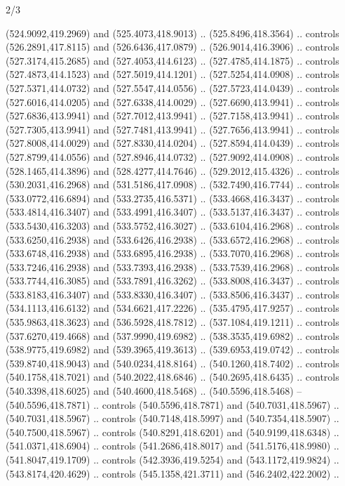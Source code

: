 \begin{flagdescription}{2/3}
\begin{scope}[xshift=0.5\flaglength,yshift=0.5\flagwidth,scale=\flagwidth/495.65]
\begin{scope}[y=0.8pt, x=0.8pt, yscale=-1,shift={(-463.76,-309.78)}]
  (524.9092,419.2969) and (525.4073,418.9013) .. (525.8496,418.3564) .. controls
  (526.2891,417.8115) and (526.6436,417.0879) .. (526.9014,416.3906) .. controls
  (527.3174,415.2685) and (527.4053,414.6123) .. (527.4785,414.1875) .. controls
  (527.4873,414.1523) and (527.5019,414.1201) .. (527.5254,414.0908) .. controls
  (527.5371,414.0732) and (527.5547,414.0556) .. (527.5723,414.0439) .. controls
  (527.6016,414.0205) and (527.6338,414.0029) .. (527.6690,413.9941) .. controls
  (527.6836,413.9941) and (527.7012,413.9941) .. (527.7158,413.9941) .. controls
  (527.7305,413.9941) and (527.7481,413.9941) .. (527.7656,413.9941) .. controls
  (527.8008,414.0029) and (527.8330,414.0204) .. (527.8594,414.0439) .. controls
  (527.8799,414.0556) and (527.8946,414.0732) .. (527.9092,414.0908) .. controls
  (528.1465,414.3896) and (528.4277,414.7646) .. (529.2012,415.4326) .. controls
  (530.2031,416.2968) and (531.5186,417.0908) .. (532.7490,416.7744) .. controls
  (533.0772,416.6894) and (533.2735,416.5371) .. (533.4668,416.3437) .. controls
  (533.4814,416.3407) and (533.4991,416.3407) .. (533.5137,416.3437) .. controls
  (533.5430,416.3203) and (533.5752,416.3027) .. (533.6104,416.2968) .. controls
  (533.6250,416.2938) and (533.6426,416.2938) .. (533.6572,416.2968) .. controls
  (533.6748,416.2938) and (533.6895,416.2938) .. (533.7070,416.2968) .. controls
  (533.7246,416.2938) and (533.7393,416.2938) .. (533.7539,416.2968) .. controls
  (533.7744,416.3085) and (533.7891,416.3262) .. (533.8008,416.3437) .. controls
  (533.8183,416.3407) and (533.8330,416.3407) .. (533.8506,416.3437) .. controls
  (534.1113,416.6132) and (534.6621,417.2226) .. (535.4795,417.9257) .. controls
  (535.9863,418.3623) and (536.5928,418.7812) .. (537.1084,419.1211) .. controls
  (537.6270,419.4668) and (537.9990,419.6982) .. (538.3535,419.6982) .. controls
  (538.9775,419.6982) and (539.3965,419.3613) .. (539.6953,419.0742) .. controls
  (539.8740,418.9043) and (540.0234,418.8164) .. (540.1260,418.7402) .. controls
  (540.1758,418.7021) and (540.2022,418.6846) .. (540.2695,418.6435) .. controls
  (540.3398,418.6025) and (540.4600,418.5468) .. (540.5596,418.5468) --
  (540.5596,418.7871) .. controls (540.5596,418.7871) and (540.7031,418.5967) ..
  (540.7031,418.5967) .. controls (540.7148,418.5997) and (540.7354,418.5907) ..
  (540.7500,418.5967) .. controls (540.8291,418.6201) and (540.9199,418.6348) ..
  (541.0371,418.6904) .. controls (541.2686,418.8017) and (541.5176,418.9980) ..
  (541.8047,419.1709) .. controls (542.3936,419.5254) and (543.1172,419.9824) ..
  (543.8174,420.4629) .. controls (545.1358,421.3711) and (546.2402,422.2002) ..

\end{scope}
\end{scope}
\end{flagdescription}
